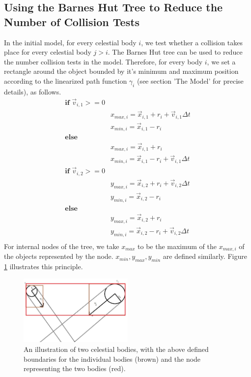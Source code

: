 \subsection{Using the Barnes Hut Tree to Reduce the Number of Collision Tests}
In the initial model, for every celestial body $i$, we test whether a collision takes place for every celestial body $j>i$. The Barnes Hut tree can be used to reduce the number collision tests in the model. Therefore, for every body $i$, we set a rectangle around the object bounded by it's minimum and maximum position according to the linearized path function $\gamma_i$ (see section 'The Model' for precise details), as follows.
\[
\begin{array}{ll}
\textbf{if } \vec{v}_{i,1} >= 0 &\\
& x_{max,i} = \vec{x}_{i,1}+r_i+\vec{v}_{i,1}\Delta t\\
& x_{min,i} = \vec{x}_{i,1}-r_i\\
\textbf{else }\\
& x_{max,i} = \vec{x}_{i,1}+r_i\\
& x_{min,i} = \vec{x}_{i,1}-r_i+\vec{v}_{i,1}\Delta t\\
\textbf{if } \vec{v}_{i,2} >= 0 & \\
& y_{max,i} = \vec{x}_{i,2}+r_i+\vec{v}_{i,2}\Delta t\\
& y_{min,i} = \vec{x}_{i,2}-r_i\\
\textbf{else } & \\
& y_{max,i} = \vec{x}_{i,2}+r_i\\
& y_{min,i} = \vec{x}_{i,2}-r_i+\vec{v}_{i,2}\Delta t\\
\end{array}
\]
For internal nodes of the tree, we take $x_{max}$ to be the maximum of the $x_{max,i}$ of the objects represented by the node. $x_{min},y_{max},y_{min}$ are defined similarly. Figure \ref{fig:grenzen} illustrates this principle.
\begin{figure}[H]
  \centering
  \includegraphics[width=0.5\textwidth]{boundaries}
  \caption{An illustration of two celestial bodies, with the above defined boundaries for the individual bodies (brown) and the node representing the two bodies (red).}
  \label{fig:grenzen}
\end{figure}
